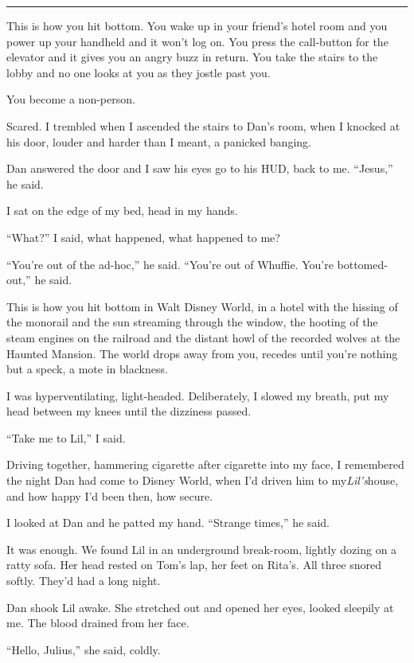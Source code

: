 \begin{center}\rule{1in}{0.4pt}\end{center}

This is how you hit bottom. You wake up in your friend's hotel room
and you power up your handheld and it won't log on. You press the
call-button for the elevator and it gives you an angry buzz in
return. You take the stairs to the lobby and no one looks at you as
they jostle past you.

You become a non-person.

Scared. I trembled when I ascended the stairs to Dan's room, when I
knocked at his door, louder and harder than I meant, a panicked
banging.

Dan answered the door and I saw his eyes go to his HUD, back to me.
“Jesus,” he said.

I sat on the edge of my bed, head in my hands.

“What?” I said, what happened, what happened to me?

“You're out of the ad-hoc,” he said. “You're out of Whuffie. You're
bottomed-out,” he said.

This is how you hit bottom in Walt Disney World, in a hotel with
the hissing of the monorail and the sun streaming through the
window, the hooting of the steam engines on the railroad and the
distant howl of the recorded wolves at the Haunted Mansion. The
world drops away from you, recedes until you're nothing but a
speck, a mote in blackness.

I was hyperventilating, light-headed. Deliberately, I slowed my
breath, put my head between my knees until the dizziness passed.

“Take me to Lil,” I said.

Driving together, hammering cigarette after cigarette into my face,
I remembered the night Dan had come to Disney World, when I'd
driven him to my{\dash}\emph{Lil's}{\dash}house, and how happy I'd been then,
how secure.

I looked at Dan and he patted my hand. “Strange times,” he said.

It was enough. We found Lil in an underground break-room, lightly
dozing on a ratty sofa. Her head rested on Tom's lap, her feet on
Rita's. All three snored softly. They'd had a long night.

Dan shook Lil awake. She stretched out and opened her eyes, looked
sleepily at me. The blood drained from her face.

“Hello, Julius,” she said, coldly.

